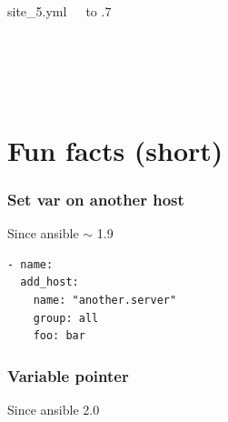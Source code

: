 \documentclass{beamer}
\begin{document}
\begin{frame}
\begin{columns}
        \begin{block}{site\_5.yml}
        \footnotesize{
            \inputminted[firstline=1, lastline=2]
                        {yaml}{sources/site_5.yml}
            \inputminted[firstline=3, lastline=3,
                        frame=single,
                        framesep=0pt]
                        {yaml}{sources/site_5.yml}
            \inputminted[firstline=4, lastline=7]
                        {yaml}{sources/site_5.yml}
            \inputminted[firstline=8, lastline=8,
                        frame=single,
                        framesep=0pt]
                        {yaml}{sources/site_5.yml}
            \inputminted[firstline=9]
                        {yaml}{sources/site_5.yml}
        }
        \end{block}
        \vbox to .7
\end{columns}
\end{frame}

\section{Fun facts (short)}

\begin{frame}[fragile]
    \frametitle{Set var on another host}
    \begin{block}{Since ansible $\sim$ 1.9}
    \begin{verbatim}
- name:
  add_host:
    name: "another.server"
    group: all
    foo: bar
    \end{verbatim}
    \end{block}
\end{frame}


\begin{frame}[fragile]
    \frametitle{Variable pointer}
    \begin{block}{Since ansible 2.0}
        \inputminted[firstline=1]{yaml}{sources/variable_name.yml}
    \end{block}
\end{frame}
\end{document}
